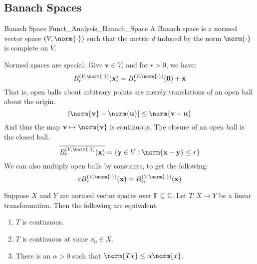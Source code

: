 \documentclass[crop=false,class=book,oneside]{standalone}                      %
\begin{document}
        \subsection{Banach Spaces}
        \begin{ldefinition}{Banach Space}
              {Funct_Analysis_Banach_Space}
            A Banach space is a normed vector space
            $(V,\norm{\cdot})$ such that the metric $d$ induced by
            the norm $\norm{\cdot}$ is complete on $V$.
        \end{ldefinition}
        Normed spaces are special. Give $\mathbf{v}\in{V}$, and
        for $r>0$, we have:
        \begin{equation}
            B_{r}^{(V,\norm{\cdot})}(\mathbf{x})=
            B_{r}^{(V,\norm{\cdot})}(\mathbf{0})+\mathbf{x}
        \end{equation}
        That is, open balls about arbitrary points are merely
        translations of an open ball about the origin.
        \begin{equation}
            |\norm{\mathbf{v}}-\norm{\mathbf{u}}|
            \leq\norm{\mathbf{v}-\mathbf{u}}
        \end{equation}
        And thus the map $\mathbf{v}\mapsto\norm{\mathbf{v}}$ is
        continuous. The closure of an open ball is the closed ball.
        \begin{equation}
            \overline{B_{r}^{(V,\norm{\cdot})}(\mathbf{x})}
            =\{\mathbf{y}\in{V}:
                \norm{\mathbf{x}-\mathbf{y}}\leq{r}\}
        \end{equation}
        We can also multiply open balls by constants, to get
        the following:
        \begin{equation}
            \varepsilon{B}_{r}^{(V,\norm{\cdot})}(\mathbf{x})=
            B_{\varepsilon{r}}^{(V,\norm{\cdot})}(\mathbf{x})
        \end{equation}
        \begin{theorem}
            Suppose $X$ and $Y$ are normed vector spaces over
            $\mathbb{F}\subseteq\mathbb{C}$. Let $T:X\rightarrow{Y}$
            be a linear transformation. Then the following
            are equivalent:
            \begin{enumerate}
                \item $T$ is continuous.
                \item $T$ is continuous at some $x_{0}\in{X}$.
                \item There is an $\alpha>0$ such that
                      $\norm{Tx}\leq\alpha\norm{x}$.
            \end{enumerate}
        \end{theorem}
\end{document}
